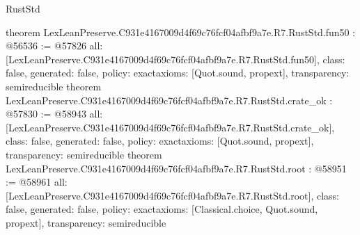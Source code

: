 \begin{lexlean}{RustStd}
\begin{coremodule}
{}
theorem LexLeanPreserve.C931e4167009d4f69c76fcf04afbf9a7e.R7.RustStd.fun50 : @56536 := @57826 {
  all: [LexLeanPreserve.C931e4167009d4f69c76fcf04afbf9a7e.R7.RustStd.fun50],
  class: false,
  generated: false,
  policy: exact{axioms: [Quot.sound, propext]},
  transparency: semireducible
}
theorem LexLeanPreserve.C931e4167009d4f69c76fcf04afbf9a7e.R7.RustStd.crate_ok : @57830 := @58943 {
  all: [LexLeanPreserve.C931e4167009d4f69c76fcf04afbf9a7e.R7.RustStd.crate_ok],
  class: false,
  generated: false,
  policy: exact{axioms: [Quot.sound, propext]},
  transparency: semireducible
}
theorem LexLeanPreserve.C931e4167009d4f69c76fcf04afbf9a7e.R7.RustStd.root : @58951 := @58961 {
  all: [LexLeanPreserve.C931e4167009d4f69c76fcf04afbf9a7e.R7.RustStd.root],
  class: false,
  generated: false,
  policy: exact{axioms: [Classical.choice, Quot.sound, propext]},
  transparency: semireducible
}


\end{coremodule}
\end{lexlean}
